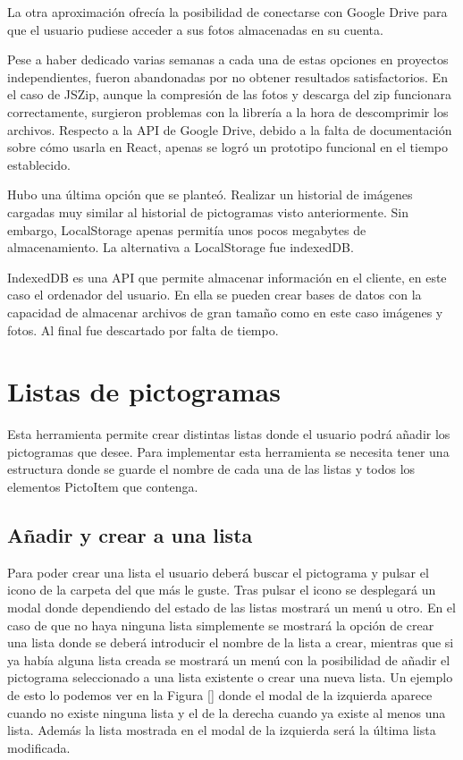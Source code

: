 La otra aproximación ofrecía la posibilidad de conectarse con Google Drive para que el usuario pudiese acceder a sus fotos almacenadas en su cuenta. 

Pese a haber dedicado varias semanas a cada una de estas opciones en proyectos independientes, fueron abandonadas por no obtener resultados satisfactorios. En el caso de JSZip, aunque la compresión de las fotos y descarga del zip funcionara correctamente, surgieron problemas con la librería a la hora de descomprimir los archivos. Respecto a la API de Google Drive, debido a la falta de documentación sobre cómo usarla en React, apenas se logró un prototipo funcional en el tiempo establecido. 

Hubo una última opción que se planteó. Realizar un historial de imágenes cargadas muy similar al historial de pictogramas visto anteriormente. Sin embargo, LocalStorage apenas permitía unos pocos megabytes de almacenamiento. La alternativa a LocalStorage fue indexedDB. 

IndexedDB es una API que permite almacenar información en el cliente, en este caso el ordenador del usuario. En ella se pueden crear bases de datos con la capacidad de almacenar archivos de gran tamaño como en este caso imágenes y fotos. Al final fue descartado por falta de tiempo.





\section{Listas de pictogramas}

Esta herramienta permite crear distintas listas donde el usuario podrá añadir los pictogramas que desee.
Para implementar esta herramienta se necesita tener una estructura donde se guarde el nombre de cada una de las listas y todos los elementos PictoItem que contenga. 

\subsection{Añadir y crear a una lista}

Para poder crear una lista el usuario deberá buscar el pictograma y pulsar el icono de la carpeta del que más le guste. Tras pulsar el icono se desplegará un modal donde dependiendo del estado de las listas mostrará un menú u otro. En el caso de que no haya ninguna lista simplemente se mostrará la opción de crear una lista donde se deberá introducir el nombre de la lista a crear, mientras que si ya había alguna lista creada se mostrará un menú con la posibilidad de añadir el pictograma seleccionado a una lista existente o crear una nueva lista. Un ejemplo de esto lo podemos ver en la Figura [] donde el modal de la izquierda aparece cuando no existe ninguna lista y el de la derecha cuando ya existe al menos una lista. Además la lista mostrada en el modal de la izquierda será la última lista modificada.

